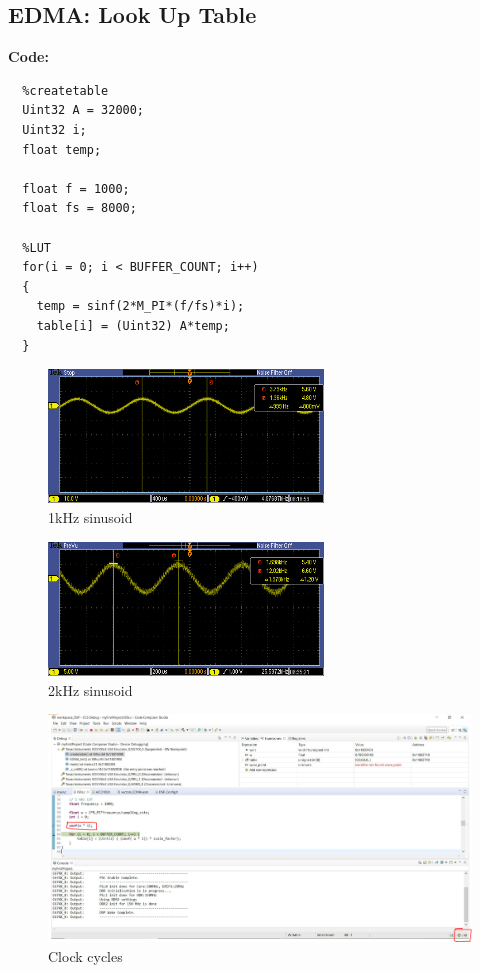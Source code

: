\documentclass{article}
\begin{document}
\clearpage
\subsection{EDMA: Look Up Table}

\textbf{Code:}

\begin{verbatim}
  %createtable
  Uint32 A = 32000;
  Uint32 i;
  float temp;

  float f = 1000;
  float fs = 8000;

  %LUT
  for(i = 0; i < BUFFER_COUNT; i++)
  {
    temp = sinf(2*M_PI*(f/fs)*i);
    table[i] = (Uint32) A*temp;
  }
\end{verbatim}

\begin{figure}[h]
  \begin{center}
    \includegraphics[width=0.65\textwidth]{img/one_khz_wave.PNG}
    \caption{1kHz sinusoid}
  \end{center}
\end{figure}

\begin{figure}[h]
  \begin{center}
    \includegraphics[width=0.65\textwidth]{img/two_khz_wave.PNG}
    \caption{2kHz sinusoid}
  \end{center}
\end{figure}

\begin{figure}[h]
  \begin{center}
    \includegraphics[width=1.0\textwidth]{img/clock_cycles_marker.PNG}
    \caption{Clock cycles}
  \end{center}
\end{figure}
\end{document}
